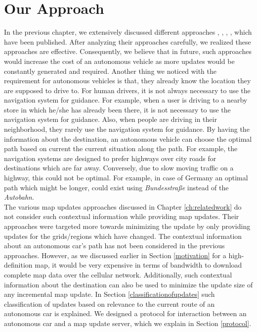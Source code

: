 \chapter{Our Approach}\label{ch:approach}
In the previous chapter, we extensively discussed different approaches \cite{min2008mobile}, \cite{cooper2001incremental}, \cite{asahara2008locally}, \cite{flament2003actmap}, \cite{fischer2012technique} which have been published. After analyzing their approaches carefully, we realized these approaches are effective. Consequently, we believe that in future, such approaches would increase the cost of an autonomous vehicle as more updates would be constantly generated and required. Another thing we noticed with the requirement for autonomous vehicles is that, they already know the location they are supposed to drive to. For human drivers, it is not always necessary to use the navigation system for guidance. For example, when a user is driving to a nearby store in which he/she has already been there, it is not necessary to use the navigation system for guidance. Also, when people are driving in their neighborhood, they rarely use the navigation system for guidance. By having the information about the destination, an autonomous vehicle can choose the optimal path based on current the current situation along the path. For example, the navigation systems are designed to prefer highways over city roads for destinations which are far away. Conversely, due to slow moving traffic on a highway, this could not be optimal. For example, in case of Germany an optimal path which might be longer, could exist using \textit{Bundesstra{\ss}e} instead of the \textit{Autobahn}. \\

The various map updates approaches discussed in Chapter \ref{ch:relatedwork} do not consider such contextual information while providing map updates. Their approaches were targeted more towards minimizing the update by only providing updates for the grids/regions which have changed. The contextual information about an autonomous car's path has not been considered in the previous approaches. However, as we discussed earlier in Section \ref{motivation} for a high-definition map, it would be very expensive in terms of bandwidth to download complete map data over the cellular network. Additionally, such contextual information about the destination can also be used to minimize the update size of any incremental map update. In Section \ref{classificationofupdates} such classification of updates based on relevance to the current route of an autonomous car is explained. We designed a protocol for interaction between an autonomous car and a map update server, which we explain in Section \ref{protocol}.

